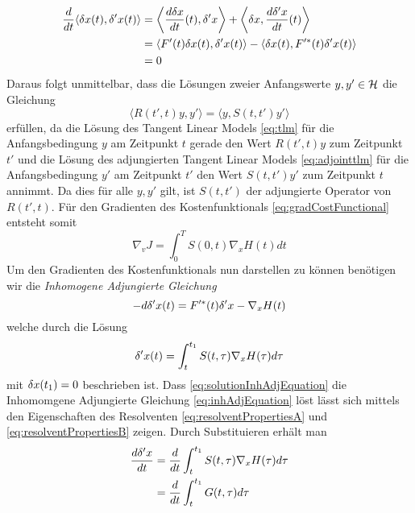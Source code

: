 \begin{equation}
\begin{aligned}
 \frac{d}{dt}\langle \delta x(t),\delta' x(t)\rangle  &= \left\langle \frac{d \delta x}{dt}(t) ,\delta' x\right\rangle +\left\langle \delta x,\frac{d\delta ' x}{dt}(t)\right\rangle \\
 &= \langle F'(t)\delta x(t),\delta 'x(t)\rangle - \langle \delta x(t),F'^*(t)\delta' x(t)\rangle\\
 &= 0
\end{aligned}
\end{equation}
Daraus folgt unmittelbar, dass die Lösungen zweier Anfangswerte $y,y' \in \mathcal{H}$ die Gleichung
\begin{equation*}
\langle R(t',t)y,y'\rangle = \langle y,S(t,t')y'\rangle 
\end{equation*}
erfüllen, da die Lösung des Tangent Linear Models \eqref{eq:tlm} für die Anfangsbedingung $y$ am Zeitpunkt $t$ gerade den Wert $R(t',t)y$ zum Zeitpunkt $t'$ und die Lösung des adjungierten Tangent Linear Models \eqref{eq:adjointtlm} für die Anfangsbedingung $y'$ am Zeitpunkt $t'$ den Wert $S(t,t')y'$ zum Zeitpunkt $t$ annimmt. Da dies für alle $y,y'$ gilt, ist $S(t,t')$ der adjungierte Operator von $R(t',t)$.
Für den Gradienten des Kostenfunktionals \eqref{eq:gradCostFunctional} entsteht somit
\begin{equation}
\label{eq:gradCostFunctionalAdjoint}
 \nabla_v J = \int_0^T S(0,t) \nabla_x H(t) dt
\end{equation}
Um den Gradienten des Kostenfunktionals nun darstellen zu können benötigen wir die \textit{Inhomogene Adjungierte Gleichung}
\begin{equation}
\label{eq:inhAdjEquation}
-d\delta'x(t) = F'^*(t)\delta'x - \nabla_x H(t)
\end{equation}
welche durch die Lösung 
\begin{equation}
\label{eq:solutionInhAdjEquation}
 \delta'x(t) = \int_t^{t_1} S(t,\tau)\nabla_x H(\tau)d\tau
\end{equation}
mit $\delta x(t_1)=0$ beschrieben ist. Dass \eqref{eq:solutionInhAdjEquation} die Inhomomgene Adjungierte Gleichung \eqref{eq:inhAdjEquation} löst lässt sich mittels den Eigenschaften des Resolventen \eqref{eq:resolventPropertiesA} und \eqref{eq:resolventPropertiesB} zeigen. Durch Substituieren erhält man
\begin{equation*}
 \begin{aligned}
  \frac{d\delta'x}{dt} &= \frac{d}{dt} \int_t^{t_1} S(t,\tau)\nabla_x H(\tau)d\tau \\
			 &= \frac{d}{dt} \int_t^{t_1} G(t,\tau)d\tau 
\end{aligned}
\end{equation*}
